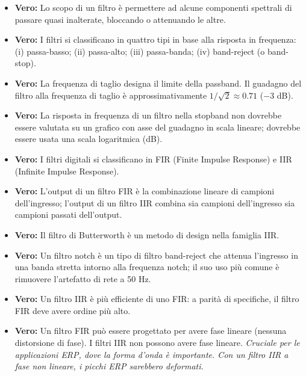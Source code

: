 \begin{itemize}
    \item \textbf{Vero:} Lo scopo di un filtro è permettere ad alcune componenti spettrali di passare quasi inalterate, bloccando o attenuando le altre.
    
    \item \textbf{Vero:} I filtri si classificano in quattro tipi in base alla risposta in frequenza: (i) passa-basso; (ii) passa-alto; (iii) passa-banda; (iv) band-reject (o band-stop).
    
    \item \textbf{Vero:} La frequenza di taglio designa il limite della passband. Il guadagno del filtro alla frequenza di taglio è approssimativamente $1/\sqrt{2} \approx 0.71$ ($-3$ dB).
    
    \item \textbf{Vero:} La risposta in frequenza di un filtro nella stopband non dovrebbe essere valutata su un grafico con asse del guadagno in scala lineare; dovrebbe essere usata una scala logaritmica (dB).
    
    \item \textbf{Vero:} I filtri digitali si classificano in FIR (Finite Impulse Response) e IIR (Infinite Impulse Response).
    
    \item \textbf{Vero:} L'output di un filtro FIR è la combinazione lineare di campioni dell'ingresso; l'output di un filtro IIR combina sia campioni dell'ingresso sia campioni passati dell'output.
    
    \item \textbf{Vero:} Il filtro di Butterworth è un metodo di design nella famiglia IIR.
    
    \item \textbf{Vero:} Un filtro notch è un tipo di filtro band-reject che attenua l'ingresso in una banda stretta intorno alla frequenza notch; il suo uso più comune è rimuovere l'artefatto di rete a 50 Hz.
    
    \item \textbf{Vero:} Un filtro IIR è più efficiente di uno FIR: a parità di specifiche, il filtro FIR deve avere ordine più alto.
    
    \item \textbf{Vero:} Un filtro FIR può essere progettato per avere fase lineare (nessuna distorsione di fase). I filtri IIR non possono avere fase lineare.
    \textit{Cruciale per le applicazioni ERP, dove la forma d'onda è importante. Con un filtro IIR a fase non lineare, i picchi ERP sarebbero deformati.}
\end{itemize}

